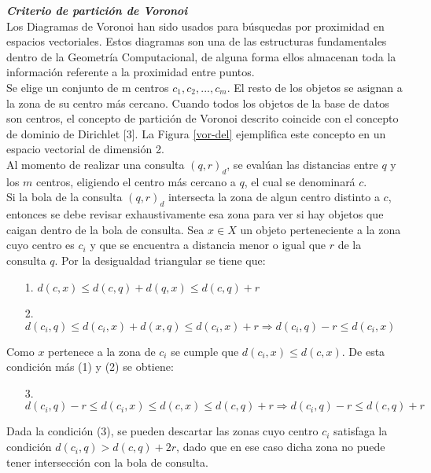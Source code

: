 \noindent \textbf{\textit{Criterio de partici\'on de Voronoi}}\\

Los Diagramas de Voronoi \cite{} han sido usados para b\'usquedas por proximidad en espacios vectoriales. Estos diagramas son una de las estructuras fundamentales dentro de la Geometr\'ia Computacional, de alguna forma ellos almacenan toda la informaci\'on referente a la proximidad entre puntos.\\

Se elige un conjunto de m centros ${c_1,c_2,...,c_m}$. El resto de los objetos se asignan a la zona de su centro m\'as cercano. Cuando todos los objetos de la base de datos son centros, el concepto de partici\'on de Voronoi descrito coincide con el concepto de dominio de Dirichlet [3]. La Figura \ref{vor-del} ejemplifica este concepto en un espacio vectorial 
de dimensi\'on 2.\\


Al momento de realizar una consulta $(q, r)_d$, se eval\'uan las distancias entre $q$ y los $m$ centros, eligiendo el centro m\'as cercano a $q$, el cual se denominar\'a $c$.\\

Si la bola de la consulta $(q, r)_d$ intersecta la zona de algun centro distinto a $c$, entonces se debe revisar exhaustivamente esa zona para ver si hay objetos que caigan dentro de la bola de consulta. Sea $x \in X$ un objeto perteneciente a la zona cuyo centro es $c_i$ y que se encuentra a distancia menor o igual que $r$ de la consulta $q$. Por la desigualdad triangular se tiene que:

\begin{enumerate}
\item [1.] $d(c,x) \leq d(c,q) + d(q,x) \leq d(c,q) + r$
\item [2.]$d(c_i,q) \leq d(c_i,x) + d(x,q) \leq d(c_i,x) + r  \Rightarrow d(c_i,q) - r \leq d(c_i,x)$
\end{enumerate}

Como $x$ pertenece a la zona de $c_i$ se cumple que  $d(c_i,x) \leq d(c,x)$. De esta condici\'on m\'as (1) y (2) se obtiene:

\begin{enumerate}
\item [3.] $d(c_i,q) - r \leq d(c_i,x) \leq d(c,x) \leq d(c,q) + r \Rightarrow d(c_i,q) - r \leq d(c,q) + r$
\end{enumerate}

Dada la condici\'on (3), se pueden descartar las zonas cuyo centro $c_i$ satisfaga la condici\'on $d(c_i,q)  > d(c,q) +2r$, dado que en ese caso dicha zona no puede tener intersecci\'on con la bola de consulta.

